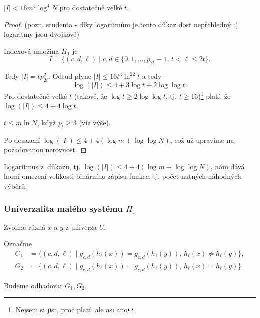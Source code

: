 \documentclass[a4paper,12pt]{article}
\begin{document}
\begin{veta}
    $|I|<16 m^4 \log^4N$ pro dostatečně velké $t$.
\end{veta}
\begin{proof}
    (pozn. studenta - díky logaritmům je tento důkaz dost nepřehledný :( logaritmy jsou dvojkové)
    
Indexová množina $
H_1$ je 
$$I=\{(c,d,\ell )\mid c,d\in \{0,1,\dots,p_{2t}-1,\,t<\ell\le 2t\}
.$$
  
Tedy $|I|=tp_{2t}^2$.   
Odtud plyne $|I|\le 16t^3\ln^22t$ a tedy 
$$\log(|I|)\le 4+3\log t+2\log\log t.$$
Pro dostatečně velké $t$ (takové, že $\log t\ge 2\log\log 
t$, tj. $t\ge 16$)\footnote{Nejsem si jist, proč platí, ale asi ano} platí, 
že $\log(|I|)\le 4+4\log t$. 

$t\le m\ln N$, když $p_t\ge 3$ (viz výše).

Po dosazení $\log(|I|)\le 4+4(\log m+\log\log N)$, což už upravíme na požadovanou nerovnost. 
\end{proof}

\begin{pozorovani}
    Logaritmus z~důkazu, tj. $\log(|I|)\le 4+4(\log m+\log\log N)$, nám dává horní omezení velikosti binárního zápisu funkce, tj. počet nutných náhodných výběrů.
\end{pozorovani}


\subsubsection{Univerzalita malého systému $H_1$}

Zvolme různá $x$ a $y$ z univerza $U$. 

\begin{definice}
Označme
\begin{align*} G_1&=\{(c,d,\ell )\mid g_{c,d}(h_{\ell}(x))=g_{c,d}(h_{\ell}
(y)),\,h_{\ell}(x)\ne h_{\ell}(y)\},\\
G_2&=\{(c,d,\ell )\mid g_{c,d}(h_{\ell}(x))=g_{c,d}(h_{\ell}(y)),\,
h_{\ell}(x)=h_{\ell}(y)\}\end{align*}
\end{definice}
Budeme odhadovat $G_1, G_2$.
\end{document}
